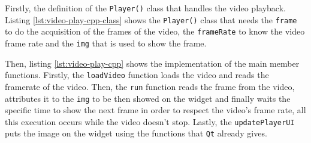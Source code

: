 Firstly, the definition of the \texttt{Player()} class that handles the video playback.
Listing \ref{lst:video-play-cpp-class} shows the \texttt{Player()} class that needs the \texttt{frame} to do the acquisition of the frames of the video, the \texttt{frameRate} to know the video frame rate and the \texttt{img} that is used to show the frame.
%

%
Then, listing \ref{lst:video-play-cpp} shows the implementation of the main member functions.
Firstly, the \texttt{loadVideo} function loads the video and reads the framerate of the video.
Then, the \texttt{run} function reads the frame from the video, attributes it to the \texttt{img} to be then showed on the widget and finally waits the specific time to show the next frame in order to respect the video's frame rate, all this execution occurs while the video doesn't stop.
Lastly, the \texttt{updatePlayerUI} puts the image on the widget using the functions that \texttt{Qt} already gives.
%

